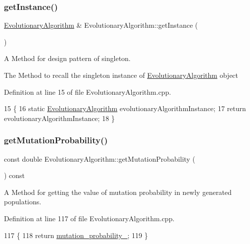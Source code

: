 \subsubsection{\texorpdfstring{get\+Instance()}{getInstance()}}
{\footnotesize\ttfamily \hyperlink{classEvolutionaryAlgorithm}{Evolutionary\+Algorithm} \& Evolutionary\+Algorithm\+::get\+Instance (\begin{DoxyParamCaption}{ }\end{DoxyParamCaption})\hspace{0.3cm}{\ttfamily [static]}}



A Method for design pattern of singleton. 

The Method to recall the singleton instance of \hyperlink{classEvolutionaryAlgorithm}{Evolutionary\+Algorithm} object 

Definition at line 15 of file Evolutionary\+Algorithm.\+cpp.


\begin{DoxyCode}
15                                                           \{
16     \textcolor{keyword}{static} \hyperlink{classEvolutionaryAlgorithm}{EvolutionaryAlgorithm} evolutionaryAlgorithmInstance;
17     \textcolor{keywordflow}{return} evolutionaryAlgorithmInstance;
18 \}
\end{DoxyCode}
\mbox{\label{classEvolutionaryAlgorithm_ae2aa7a6fdbfb3a065aecdb7a5488bcc6}} 
\subsubsection{\texorpdfstring{get\+Mutation\+Probability()}{getMutationProbability()}}
{\footnotesize\ttfamily const double Evolutionary\+Algorithm\+::get\+Mutation\+Probability (\begin{DoxyParamCaption}{ }\end{DoxyParamCaption}) const}



A Method for getting the value of mutation probability in newly generated populations. 



Definition at line 117 of file Evolutionary\+Algorithm.\+cpp.


\begin{DoxyCode}
117                                                                  \{
118     \textcolor{keywordflow}{return} \hyperlink{classEvolutionaryAlgorithm_ab847e49664c7b97e1e55963e6f33b332}{mutation\_probability\_};
119 \}
\end{DoxyCode}
\mbox{\label{classEvolutionaryAlgorithm_aa4dc48e8ad0d0e5892546ce6978f492f}} 
